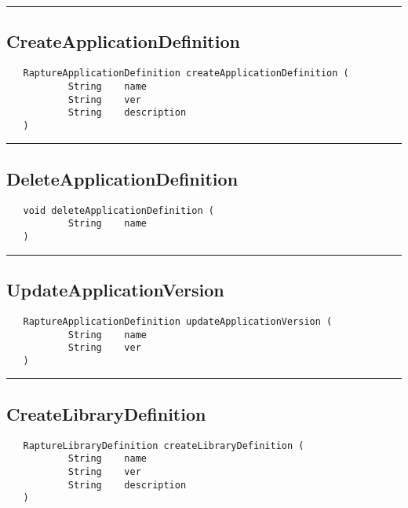 \rule{15cm}{2pt}
\subsection{CreateApplicationDefinition}
\label{Api:CreateApplicationDefinition}
\begin{verbatim}
   RaptureApplicationDefinition createApplicationDefinition (
           String    name
           String    ver
           String    description
   )
\end{verbatim}



\rule{15cm}{2pt}
\subsection{DeleteApplicationDefinition}
\label{Api:DeleteApplicationDefinition}
\begin{verbatim}
   void deleteApplicationDefinition (
           String    name
   )
\end{verbatim}



\rule{15cm}{2pt}
\subsection{UpdateApplicationVersion}
\label{Api:UpdateApplicationVersion}
\begin{verbatim}
   RaptureApplicationDefinition updateApplicationVersion (
           String    name
           String    ver
   )
\end{verbatim}



\rule{15cm}{2pt}
\subsection{CreateLibraryDefinition}
\label{Api:CreateLibraryDefinition}
\begin{verbatim}
   RaptureLibraryDefinition createLibraryDefinition (
           String    name
           String    ver
           String    description
   )
\end{verbatim}



